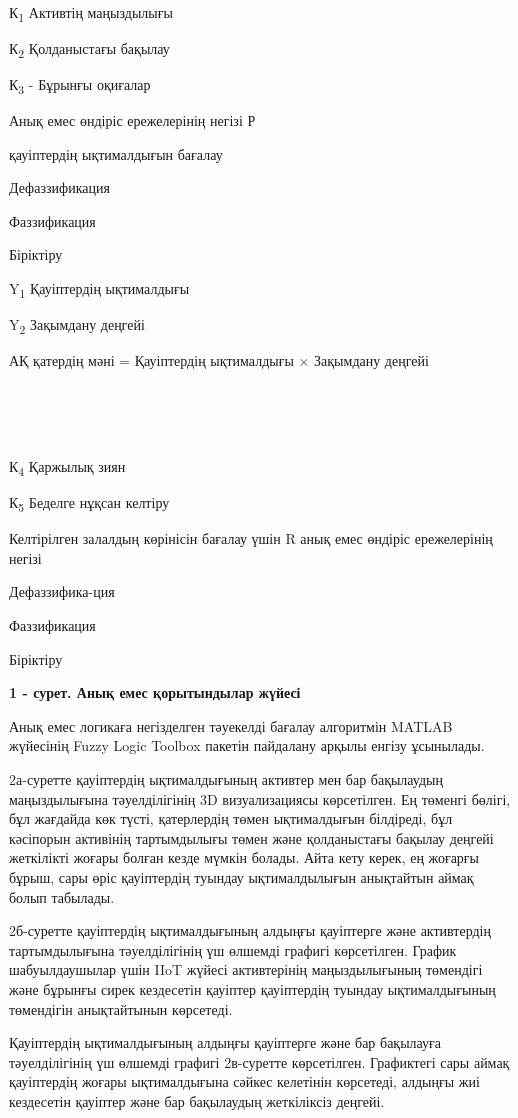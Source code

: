 ~

К\textsubscript{1} Активтің маңыздылығы

К\textsubscript{2} Қолданыстағы бақылау

К\textsubscript{3} - Бұрынғы оқиғалар

Анық емес өндіріс ережелерінің негізі Р

қауіптердің ықтималдығын бағалау

Дефаззификация

Фаззификация

Біріктіру

Y\textsubscript{1} Қауіптердің ықтималдығы

Y\textsubscript{2} Зақымдану деңгейі

АҚ қатердің мәні = Қауіптердің ықтималдығы × Зақымдану деңгейі

\textsubscript{~}

\textsubscript{~}

К\textsubscript{4} Қаржылық зиян

К\textsubscript{5} Беделге нұқсан келтіру

Келтірілген залалдың көрінісін бағалау үшін R анық емес өндіріс
ережелерінің негізі

Дефаззифика-ция

Фаззификация

Біріктіру

{\bfseries 1 - сурет. Анық емес қорытындылар жүйесі}

Анық емес логикаға негізделген тәуекелді бағалау алгоритмін MATLAB
жүйесінің Fuzzy Logic Toolbox пакетін пайдалану арқылы енгізу ұсынылады.

2а-суретте қауіптердің ықтималдығының активтер мен бар бақылаудың
маңыздылығына тәуелділігінің 3D визуализациясы көрсетілген. Ең төменгі
бөлігі, бұл жағдайда көк түсті, қатерлердің төмен ықтималдығын
білдіреді, бұл кәсіпорын активінің тартымдылығы төмен және қолданыстағы
бақылау деңгейі жеткілікті жоғары болған кезде мүмкін болады. Айта кету
керек, ең жоғарғы бұрыш, сары өріс қауіптердің туындау ықтималдылығын
анықтайтын аймақ болып табылады.

2б-суретте қауіптердің ықтималдығының алдыңғы қауіптерге және
активтердің тартымдылығына тәуелділігінің үш өлшемді графигі
көрсетілген. График шабуылдаушылар үшін IIoT жүйесі активтерінің
маңыздылығының төмендігі және бұрынғы сирек кездесетін қауіптер
қауіптердің туындау ықтималдығының төмендігін анықтайтынын көрсетеді.

Қауіптердің ықтималдығының алдыңғы қауіптерге және бар бақылауға
тәуелділігінің үш өлшемді графигі 2в-суретте көрсетілген. Графиктегі
сары аймақ қауіптердің жоғары ықтималдығына сәйкес келетінін көрсетеді,
алдыңғы жиі кездесетін қауіптер және бар бақылаудың жеткіліксіз деңгейі.

